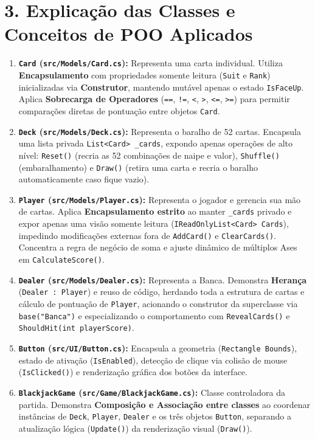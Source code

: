\documentclass[10pt,a4paper]{article}
\begin{document}
\section*{3. Explicação das Classes e Conceitos de POO Aplicados}

\begin{enumerate}
    \item \textbf{\texttt{Card} (\texttt{src/Models/Card.cs}):} Representa uma carta individual. Utiliza \textbf{Encapsulamento} com propriedades somente leitura (\texttt{Suit} e \texttt{Rank}) inicializadas via \textbf{Construtor}, mantendo mutável apenas o estado \texttt{IsFaceUp}. Aplica \textbf{Sobrecarga de Operadores} (\texttt{==}, \texttt{!=}, \texttt{<}, \texttt{>}, \texttt{<=}, \texttt{>=}) para permitir comparações diretas de pontuação entre objetos \texttt{Card}.
    \item \textbf{\texttt{Deck} (\texttt{src/Models/Deck.cs}):} Representa o baralho de 52 cartas. Encapsula uma lista privada \texttt{List<Card> \_cards}, expondo apenas operações de alto nível: \texttt{Reset()} (recria as 52 combinações de naipe e valor), \texttt{Shuffle()} (embaralhamento) e \texttt{Draw()} (retira uma carta e recria o baralho automaticamente caso fique vazio).
    \item \textbf{\texttt{Player} (\texttt{src/Models/Player.cs}):} Representa o jogador e gerencia sua mão de cartas. Aplica \textbf{Encapsulamento estrito} ao manter \texttt{\_cards} privado e expor apenas uma visão somente leitura (\texttt{IReadOnlyList<Card> Cards}), impedindo modificações externas fora de \texttt{AddCard()} e \texttt{ClearCards()}. Concentra a regra de negócio de soma e ajuste dinâmico de múltiplos Ases em \texttt{CalculateScore()}.
    \item \textbf{\texttt{Dealer} (\texttt{src/Models/Dealer.cs}):} Representa a Banca. Demonstra \textbf{Herança} (\texttt{Dealer : Player}) e reuso de código, herdando toda a estrutura de cartas e cálculo de pontuação de \texttt{Player}, acionando o construtor da superclasse via \texttt{base("Banca")} e especializando o comportamento com \texttt{RevealCards()} e \texttt{ShouldHit(int playerScore)}.
    \item \textbf{\texttt{Button} (\texttt{src/UI/Button.cs}):} Encapsula a geometria (\texttt{Rectangle Bounds}), estado de ativação (\texttt{IsEnabled}), detecção de clique via colisão de mouse (\texttt{IsClicked()}) e renderização gráfica dos botões da interface.
    \item \textbf{\texttt{BlackjackGame} (\texttt{src/Game/BlackjackGame.cs}):} Classe controladora da partida. Demonstra \textbf{Composição e Associação entre classes} ao coordenar instâncias de \texttt{Deck}, \texttt{Player}, \texttt{Dealer} e os três objetos \texttt{Button}, separando a atualização lógica (\texttt{Update()}) da renderização visual (\texttt{Draw()}).
\end{enumerate}
\end{document}
